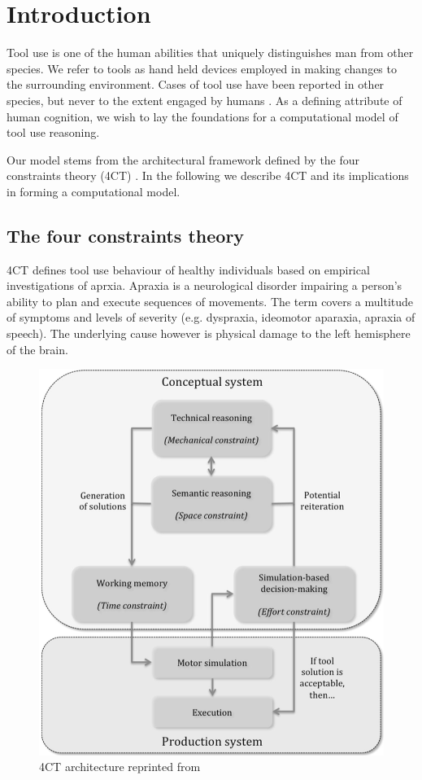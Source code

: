 \documentclass[11]{article}
\begin{document}
\section{Introduction}
Tool use is one of the human abilities that uniquely distinguishes man from other species. 
We refer to tools as hand held devices employed in making changes to the surrounding environment. 
Cases of tool use have been reported in other species, but never to the extent engaged by humans \cite{boysen1999,harrington2009,lefebvre2004}. 
As a defining attribute of human cognition, we wish to lay the foundations for a computational model of tool use reasoning.

Our model stems from the architectural framework defined by the four constraints theory (4CT) \cite{osiurak2014a}.
In the following we describe 4CT and its implications in forming a computational model.  

\subsection{The four constraints theory}
4CT defines tool use behaviour of healthy individuals based on empirical investigations of aprxia.
Apraxia is a neurological disorder impairing a person's ability to plan and execute sequences of movements.
The term covers a multitude of symptoms and levels of severity (e.g. dyspraxia, ideomotor aparaxia, apraxia of speech).
The underlying cause however is physical damage to the left hemisphere of the brain\cite{osiurak2013}.

\begin{figure}[h]
  \centering
  \includegraphics[width=.9\textwidth]{./figures/4CTArchitecture.png}
  \caption{4CT architecture reprinted from \cite{osiurak2014a}}
  \label{fig:4CTArchitecture}
\end{figure}      
\end{document}
